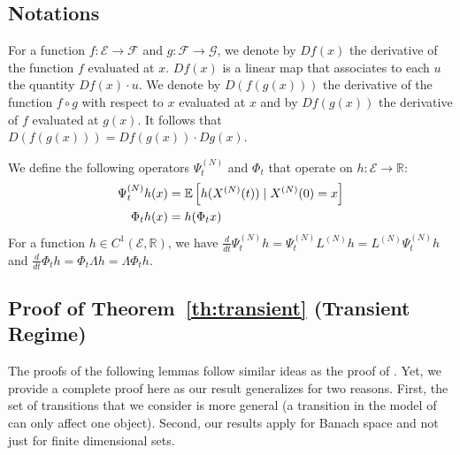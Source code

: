 \documentclass[sigconf]{acmart}
\newcommand\XN{X^{(N)}}
\newcommand\LN{L^{(N)}}
\newcommand\PsiN{\Psi^{(N)}}
\newcommand\E{\mathcal{E}}
\newcommand\R{\mathbb{R}}
\newcommand\esp[1]{{\mathchoice{\besp{#1}}{\sesp{#1}}{\sesp{#1}}{\sesp{#1}}}}
\newcommand\besp[1]{\mathbb{E}\left[#1\right]}
\newcommand\sesp[1]{\mathbb{E}[#1]}
\newcommand\F{\mathcal{F}}
\newcommand\dt{\frac{d}{dt}}
\begin{document}
\subsection*{Notations} 
For a function $f:\E\to\F$ and $g:\F\to\mathcal{G}$, we denote by
$Df(x)$ the derivative of the function $f$ evaluated at $x$. $Df(x)$
is a linear map that associates to each $u$ the quantity
$Df(x)\cdot u$.  We denote by $D(f(g(x)))$ the derivative of the
function $f\circ g$ with respect to $x$ evaluated at $x$ and by
$Df(g(x))$ the derivative of $f$ evaluated at $g(x)$. It follows
that $D(f(g(x)))=Df(g(x))\cdot
Dg(x)$.  

We define the following operators $\PsiN_t$ and $\Phi_t$ that operate
on $h:\E\to\R$:
\begin{align}
  \PsiN_t h (x) &= \esp{ h(\XN(t)) \mid \XN(0) = x} \label{eq:operatorN}\\
  \Phi_t h (x) &= h( \Phi_tx ) \label{eq:operatorInf}
\end{align}
For a function $h\in C^1(\E,\R)$, we have
$\dt \PsiN_th = \PsiN_t\LN h= \LN\PsiN_t h$ and
$\dt \Phi_th = \Phi_t\Lambda h= \Lambda\Phi_t h$.




\subsection{Proof of Theorem~\ref{th:transient} (Transient Regime)}
\label{sec:proof_t}

The proofs of the following lemmas follow similar ideas as the proof
of \cite[Theorem~1]{kolokoltsov2011mean}. Yet, we provide a complete
proof here as our result generalizes
\cite[Theorem~1]{kolokoltsov2011mean} for two reasons.  First, the set
of transitions that we consider is more general (a transition in the
model of \cite{kolokoltsov2011mean} can only affect one
object). Second, our results apply for Banach space and not just for
finite dimensional sets.
\end{document}
